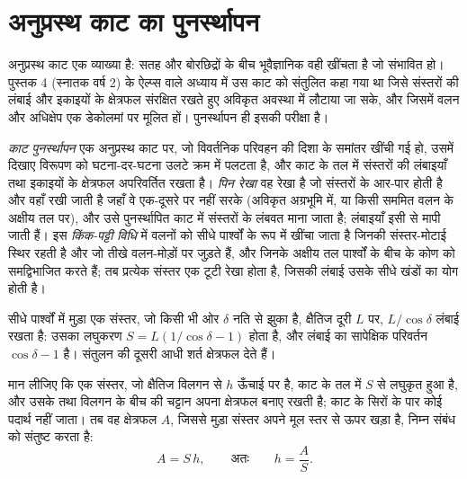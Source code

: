 \section{अनुप्रस्थ काट का पुनर्स्थापन}\label{sec:b3:structural-analysis:restoration}

अनुप्रस्थ काट एक व्याख्या है: सतह और बोरछिद्रों के बीच
भूवैज्ञानिक वही खींचता है जो संभावित हो। पुस्तक 4 (स्नातक वर्ष 2) के ऐल्प्स वाले अध्याय में
उस काट को संतुलित कहा गया था जिसे संस्तरों की लंबाई और इकाइयों के क्षेत्रफल संरक्षित रखते हुए
अविकृत अवस्था में लौटाया जा सके, और जिसमें वलन और अधिक्षेप एक डेकोलमां पर मूलित हों।
पुनर्स्थापन ही इसकी परीक्षा है।

\begin{definition}[काट पुनर्स्थापन, पिन रेखा, किंक-पट्टी विधि]\label{def:b3:structural-analysis:restoration}
\emph{काट पुनर्स्थापन} एक अनुप्रस्थ काट पर, जो विवर्तनिक परिवहन की दिशा
के समांतर खींची गई हो, उसमें दिखाए विरूपण को घटना-दर-घटना उलटे क्रम में पलटता है,
और काट के तल में संस्तरों की लंबाइयाँ तथा इकाइयों के क्षेत्रफल
अपरिवर्तित रखता है।
\emph{पिन रेखा} वह रेखा है जो संस्तरों के आर-पार होती है और वहाँ रखी जाती है जहाँ वे
एक-दूसरे पर नहीं सरके (अविकृत अग्रभूमि में, या किसी सममित वलन के अक्षीय
तल पर), और उसे पुनर्स्थापित काट में संस्तरों के लंबवत माना जाता है;
लंबाइयाँ इसी से मापी जाती हैं। इस
\emph{किंक-पट्टी विधि} में वलनों को सीधे पार्श्वों के रूप में खींचा जाता है
जिनकी संस्तर-मोटाई स्थिर रहती है और जो तीखे वलन-मोड़ों पर जुड़ते हैं, और जिनके अक्षीय तल
पार्श्वों के बीच के कोण को समद्विभाजित करते हैं; तब प्रत्येक संस्तर एक टूटी रेखा होता है, जिसकी
लंबाई उसके सीधे खंडों का योग होती है।
\end{definition}

सीधे पार्श्वों में मुड़ा एक संस्तर, जो किसी भी ओर $\delta$ नति से झुका है, क्षैतिज दूरी
$L$ पर, $L/\cos\delta$ लंबाई रखता है: उसका लघुकरण
$S = L(1/\cos\delta - 1)$ होता है, और लंबाई का सापेक्षिक परिवर्तन $\cos\delta - 1$ है।
संतुलन की दूसरी आधी शर्त क्षेत्रफल देते हैं।

\begin{proposition}\label{prop:b3:structural-analysis:detachment}
मान लीजिए कि एक संस्तर, जो क्षैतिज विलगन से $h$ ऊँचाई पर है, काट के तल में $S$ से लघुकृत हुआ है,
और उसके तथा विलगन के बीच की चट्टान अपना क्षेत्रफल बनाए रखती है;
काट के सिरों के पार कोई पदार्थ नहीं जाता। तब वह क्षेत्रफल $A$, जिससे मुड़ा संस्तर
अपने मूल स्तर से ऊपर खड़ा है, निम्न संबंध को संतुष्ट करता है:
\[
  A = S\,h , \qquad\text{अतः}\qquad h = \frac AS .
\]
\end{proposition}

